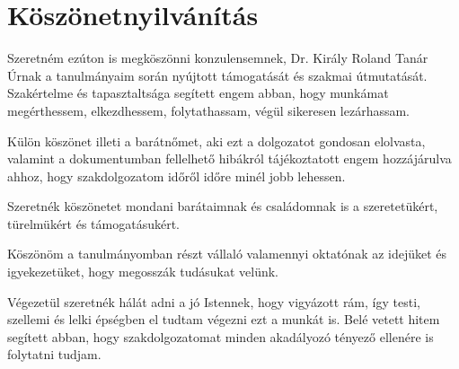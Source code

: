 \documentclass[tocnopagenum]{thesis-ekf}
\theoremstyle{definition}
\theoremstyle{remark}
\begin{document}
	\chapter*{Köszönetnyilvánítás}
	Szeretném ezúton is megköszönni konzulensemnek, Dr. Király Roland Tanár Úrnak a tanulmányaim során nyújtott támogatását és szakmai útmutatását. Szakértelme és tapasztaltsága segített engem abban, hogy munkámat megérthessem, elkezdhessem, folytathassam, végül sikeresen lezárhassam.
	
	Külön köszönet illeti a barátnőmet, aki ezt a dolgozatot gondosan elolvasta, valamint a dokumentumban fellelhető hibákról tájékoztatott engem hozzájárulva ahhoz, hogy szakdolgozatom időről időre minél jobb lehessen.
	
	Szeretnék köszönetet mondani barátaimnak és családomnak is a szeretetükért, türelmükért és támogatásukért.
	
	Köszönöm a tanulmányomban részt vállaló valamennyi oktatónak az idejüket és igyekezetüket, hogy megosszák tudásukat velünk.
	
	Végezetül szeretnék hálát adni a jó Istennek, hogy vigyázott rám, így testi, szellemi és lelki épségben el tudtam végezni ezt a munkát is. Belé vetett hitem segített abban, hogy szakdolgozatomat minden akadályozó tényező ellenére is folytatni tudjam.
	
	
	\listoffigures
\end{document}
